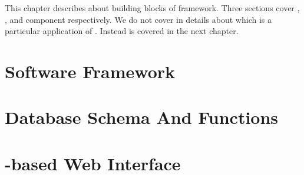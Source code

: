 
This chapter describes about building blocks of {\pubs} framework.
Three sections cover {\psql}, {\python}, and {\php} component respectively.
We do not cover in details about {\dstream} which is a particular application
of {\pubs}. Instead {\dstream} is covered in the next chapter.

\section{{\python} Software Framework}


\section{{\psql} Database Schema And Functions}


\section{{\php}-based Web Interface}



